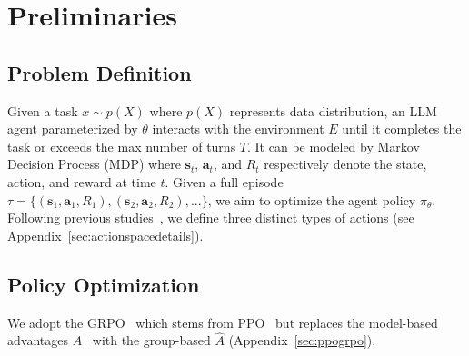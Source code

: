 \documentclass[]{youtu} %
\newcommand{\method}{\textsc{SPEAR}\xspace}
\begin{document}
\section{Preliminaries}



\subsection{Problem Definition}
\label{sec:problemdefinition}

Given a task $x\sim p(X)$ where $p(X)$ represents data distribution,
an LLM agent parameterized by $\theta$ interacts with the environment $E$ until it completes the task or exceeds the max number of turns $T$.
It can be modeled by Markov Decision Process (MDP) where $\mathbf{s}_t$, $\mathbf{a}_t$, and $R_t$ respectively denote the state, action, and reward at time $t$.
Given a full episode $\tau=\{(\mathbf{s}_1, \mathbf{a}_1, R_1), (\mathbf{s}_2, \mathbf{a}_2, R_2),...\}$,
we aim to optimize the agent policy $\pi_{\theta}$.
\label{sec:actionspace}
Following previous studies~\cite{dong2025tool,feng2025group,feng2025retool,dong2025agentic}, 
we define three distinct types of actions
(see Appendix~\ref{sec:actionspacedetails}).





\subsection{Policy Optimization}
\label{sec:policyoptimization}


We adopt the GRPO~\cite{shao2024deepseekmath} which stems from PPO~\cite{schulman2017equivalence,schulman2017proximal} but 
replaces the model-based advantages ${A}$~\cite{schulman2015high}
with the group-based $\hat{A}$ (Appendix~\ref{sec:ppogrpo}).
\end{document}
